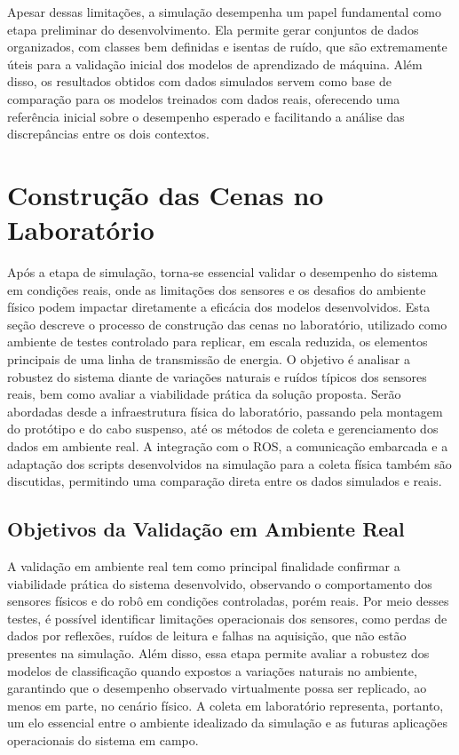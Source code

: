 Apesar dessas limitações, a simulação desempenha um papel fundamental como etapa preliminar do desenvolvimento. Ela permite gerar conjuntos de dados organizados, com classes bem definidas e isentas de ruído, que são extremamente úteis para a validação inicial dos modelos de aprendizado de máquina. Além disso, os resultados obtidos com dados simulados servem como base de comparação para os modelos treinados com dados reais, oferecendo uma referência inicial sobre o desempenho esperado e facilitando a análise das discrepâncias entre os dois contextos.

\section{Construção das Cenas no Laboratório}

Após a etapa de simulação, torna-se essencial validar o desempenho do sistema em condições reais, onde as limitações dos sensores e os desafios do ambiente físico podem impactar diretamente a eficácia dos modelos desenvolvidos. Esta seção descreve o processo de construção das cenas no laboratório, utilizado como ambiente de testes controlado para replicar, em escala reduzida, os elementos principais de uma linha de transmissão de energia. O objetivo é analisar a robustez do sistema diante de variações naturais e ruídos típicos dos sensores reais, bem como avaliar a viabilidade prática da solução proposta. Serão abordadas desde a infraestrutura física do laboratório, passando pela montagem do protótipo e do cabo suspenso, até os métodos de coleta e gerenciamento dos dados em ambiente real. A integração com o ROS, a comunicação embarcada e a adaptação dos scripts desenvolvidos na simulação para a coleta física também são discutidas, permitindo uma comparação direta entre os dados simulados e reais.


\subsection{Objetivos da Validação em Ambiente Real}

A validação em ambiente real tem como principal finalidade confirmar a viabilidade prática do sistema desenvolvido, observando o comportamento dos sensores físicos e do robô em condições controladas, porém reais. Por meio desses testes, é possível identificar limitações operacionais dos sensores, como perdas de dados por reflexões, ruídos de leitura e falhas na aquisição, que não estão presentes na simulação. Além disso, essa etapa permite avaliar a robustez dos modelos de classificação quando expostos a variações naturais no ambiente, garantindo que o desempenho observado virtualmente possa ser replicado, ao menos em parte, no cenário físico. A coleta em laboratório representa, portanto, um elo essencial entre o ambiente idealizado da simulação e as futuras aplicações operacionais do sistema em campo.

